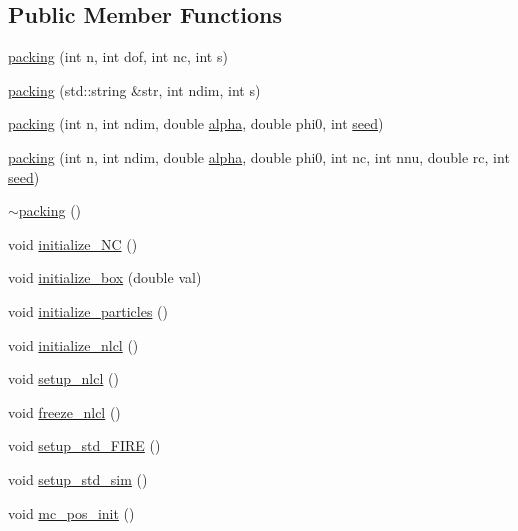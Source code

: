 \subsection*{Public Member Functions}
\begin{DoxyCompactItemize}
\item 
\mbox{\hyperlink{classpacking_aec1b63190de5c8e69e47a06bfb7db0d5}{packing}} (int n, int dof, int nc, int s)
\item 
\mbox{\hyperlink{classpacking_ac345d2c7345a103d7b390585565d2712}{packing}} (std\+::string \&str, int ndim, int s)
\item 
\mbox{\hyperlink{classpacking_a954ef88de3bcf03906e7b9c1511c4338}{packing}} (int n, int ndim, double \mbox{\hyperlink{classpacking_a9683c4c16704f81b0086a7639f030953}{alpha}}, double phi0, int \mbox{\hyperlink{classpacking_aa5a588c50b2c22b3c2917a2da12f33e5}{seed}})
\item 
\mbox{\hyperlink{classpacking_ae34dd16515628814825132a9dbf06543}{packing}} (int n, int ndim, double \mbox{\hyperlink{classpacking_a9683c4c16704f81b0086a7639f030953}{alpha}}, double phi0, int nc, int nnu, double rc, int \mbox{\hyperlink{classpacking_aa5a588c50b2c22b3c2917a2da12f33e5}{seed}})
\item 
\mbox{\hyperlink{classpacking_a985cd1712c1e0c7e9f3927e847383810}{$\sim$packing}} ()
\item 
void \mbox{\hyperlink{classpacking_a00d1be8bf289c4a8a29fa915c9db13e9}{initialize\+\_\+\+NC}} ()
\item 
void \mbox{\hyperlink{classpacking_a16af9b32d0aa64fe236bc73ca5b98248}{initialize\+\_\+box}} (double val)
\item 
void \mbox{\hyperlink{classpacking_a87d6f5a31dd8c3c0f30c40f6e8b478f2}{initialize\+\_\+particles}} ()
\item 
void \mbox{\hyperlink{classpacking_af1514931993a8ea4fd14ff53f7d38b70}{initialize\+\_\+nlcl}} ()
\item 
void \mbox{\hyperlink{classpacking_a1f49ca3dbade782f8da82c946a2be238}{setup\+\_\+nlcl}} ()
\item 
void \mbox{\hyperlink{classpacking_aff094d1084949ed63ca374373e8d312b}{freeze\+\_\+nlcl}} ()
\item 
void \mbox{\hyperlink{classpacking_a02683527b4a5e41e2b9eaac44672cf9f}{setup\+\_\+std\+\_\+\+F\+I\+RE}} ()
\item 
void \mbox{\hyperlink{classpacking_afc22f53f3fa942d5347a3ebfeacae2bf}{setup\+\_\+std\+\_\+sim}} ()
\item 
void \mbox{\hyperlink{classpacking_a706d5c77cb054dadbf181fe1b68c6eda}{mc\+\_\+pos\+\_\+init}} ()

\end{DoxyCompactItemize}
